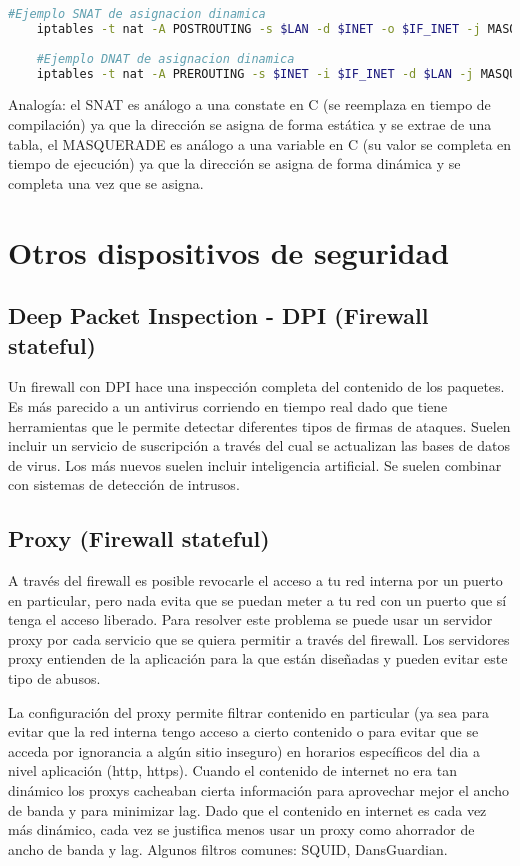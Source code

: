 \documentclass{book}
\begin{document}
	\begin{lstlisting}[language=sh]
	#Ejemplo SNAT de asignacion dinamica
	iptables -t nat -A POSTROUTING -s $LAN -d $INET -o $IF_INET -j MASQUERADE
	
	#Ejemplo DNAT de asignacion dinamica
	iptables -t nat -A PREROUTING -s $INET -i $IF_INET -d $LAN -j MASQUERADE
	\end{lstlisting}
	
	\vspace{3mm}
	Analogía: el SNAT es análogo a una constate en C (se reemplaza en tiempo de compilación) ya que la dirección se asigna de forma estática y se extrae de una tabla, el MASQUERADE es análogo a una variable en C (su valor se completa en tiempo de ejecución) ya que la dirección se asigna de forma dinámica y se completa una vez que se asigna.
	
	\pagebreak
	\section{Otros dispositivos de seguridad}
	
	\subsection{Deep Packet Inspection - DPI (Firewall stateful)}
	Un firewall con DPI hace una inspección completa del contenido de los paquetes. Es más parecido a un antivirus corriendo en tiempo real dado que tiene herramientas que le permite detectar diferentes tipos de firmas de ataques. Suelen incluir un servicio de suscripción a través del cual se actualizan las bases de datos de virus. Los más nuevos suelen incluir inteligencia artificial. Se suelen combinar con sistemas de detección de intrusos.
	
	\subsection{Proxy (Firewall stateful)}
	A través del firewall es posible revocarle el acceso a tu red interna por un puerto en particular, pero nada evita que se puedan meter a tu red con un puerto que sí tenga el acceso liberado. Para resolver este problema se puede usar un servidor proxy por cada servicio que se quiera permitir a través del firewall. Los servidores proxy entienden de la aplicación para la que están diseñadas y pueden evitar este tipo de abusos.
	
	\vspace{3mm}
	La configuración del proxy permite filtrar contenido en particular (ya sea para evitar que la red interna tengo acceso a cierto contenido o para evitar que se acceda por ignorancia a algún sitio inseguro) en horarios específicos del dia a nivel aplicación (http, https). Cuando el contenido de internet no era tan dinámico los proxys cacheaban cierta información para aprovechar mejor el ancho de banda y para minimizar lag. Dado que el contenido en internet es cada vez más dinámico, cada vez se justifica menos usar un proxy como ahorrador de ancho de banda y lag. Algunos filtros comunes: SQUID, DansGuardian.
	
\end{document}
